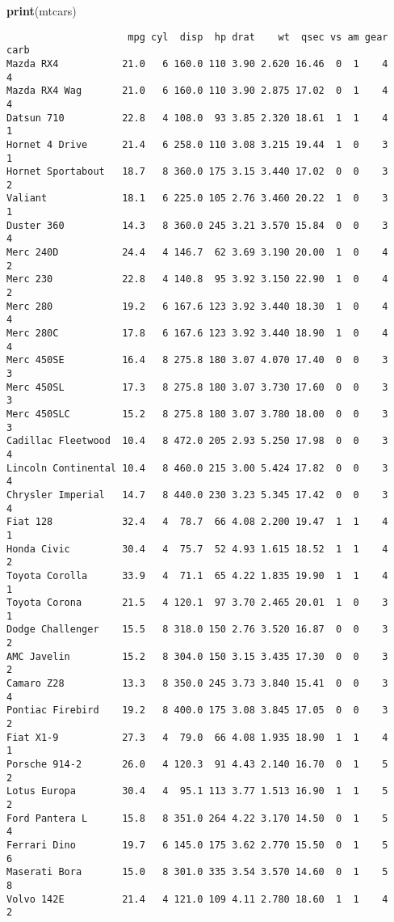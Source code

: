 \documentclass[
  french,
]{article}
\newenvironment{Shaded}{\begin{snugshade}}{\end{snugshade}}
\newcommand{\KeywordTok}[1]{\textcolor[rgb]{0.13,0.29,0.53}{\textbf{#1}}}
\newcommand{\NormalTok}[1]{#1}
\begin{document}
\begin{Shaded}
\begin{Highlighting}[]
\KeywordTok{print}\NormalTok{(mtcars)}
\end{Highlighting}
\end{Shaded}

\begin{verbatim}
                     mpg cyl  disp  hp drat    wt  qsec vs am gear carb
Mazda RX4           21.0   6 160.0 110 3.90 2.620 16.46  0  1    4    4
Mazda RX4 Wag       21.0   6 160.0 110 3.90 2.875 17.02  0  1    4    4
Datsun 710          22.8   4 108.0  93 3.85 2.320 18.61  1  1    4    1
Hornet 4 Drive      21.4   6 258.0 110 3.08 3.215 19.44  1  0    3    1
Hornet Sportabout   18.7   8 360.0 175 3.15 3.440 17.02  0  0    3    2
Valiant             18.1   6 225.0 105 2.76 3.460 20.22  1  0    3    1
Duster 360          14.3   8 360.0 245 3.21 3.570 15.84  0  0    3    4
Merc 240D           24.4   4 146.7  62 3.69 3.190 20.00  1  0    4    2
Merc 230            22.8   4 140.8  95 3.92 3.150 22.90  1  0    4    2
Merc 280            19.2   6 167.6 123 3.92 3.440 18.30  1  0    4    4
Merc 280C           17.8   6 167.6 123 3.92 3.440 18.90  1  0    4    4
Merc 450SE          16.4   8 275.8 180 3.07 4.070 17.40  0  0    3    3
Merc 450SL          17.3   8 275.8 180 3.07 3.730 17.60  0  0    3    3
Merc 450SLC         15.2   8 275.8 180 3.07 3.780 18.00  0  0    3    3
Cadillac Fleetwood  10.4   8 472.0 205 2.93 5.250 17.98  0  0    3    4
Lincoln Continental 10.4   8 460.0 215 3.00 5.424 17.82  0  0    3    4
Chrysler Imperial   14.7   8 440.0 230 3.23 5.345 17.42  0  0    3    4
Fiat 128            32.4   4  78.7  66 4.08 2.200 19.47  1  1    4    1
Honda Civic         30.4   4  75.7  52 4.93 1.615 18.52  1  1    4    2
Toyota Corolla      33.9   4  71.1  65 4.22 1.835 19.90  1  1    4    1
Toyota Corona       21.5   4 120.1  97 3.70 2.465 20.01  1  0    3    1
Dodge Challenger    15.5   8 318.0 150 2.76 3.520 16.87  0  0    3    2
AMC Javelin         15.2   8 304.0 150 3.15 3.435 17.30  0  0    3    2
Camaro Z28          13.3   8 350.0 245 3.73 3.840 15.41  0  0    3    4
Pontiac Firebird    19.2   8 400.0 175 3.08 3.845 17.05  0  0    3    2
Fiat X1-9           27.3   4  79.0  66 4.08 1.935 18.90  1  1    4    1
Porsche 914-2       26.0   4 120.3  91 4.43 2.140 16.70  0  1    5    2
Lotus Europa        30.4   4  95.1 113 3.77 1.513 16.90  1  1    5    2
Ford Pantera L      15.8   8 351.0 264 4.22 3.170 14.50  0  1    5    4
Ferrari Dino        19.7   6 145.0 175 3.62 2.770 15.50  0  1    5    6
Maserati Bora       15.0   8 301.0 335 3.54 3.570 14.60  0  1    5    8
Volvo 142E          21.4   4 121.0 109 4.11 2.780 18.60  1  1    4    2
\end{verbatim}
\end{document}

